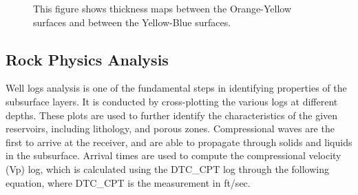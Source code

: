 \documentclass[fleqn]{article}
\begin{document}
\begin{figure}[H]
    \centering
    \caption{This figure shows thickness maps between the Orange-Yellow surfaces and between the Yellow-Blue surfaces.}
    \label{fig:ThicknessMaps}
\end{figure}

\subsection{Rock Physics Analysis}
Well logs analysis is one of the fundamental steps in identifying properties of the subsurface layers. It is conducted by cross-plotting the various logs at different depths. These plots are used to further identify the characteristics of the given reservoirs, including lithology, and porous zones. Compressional waves are the first to arrive at the receiver, and are able to propagate through solids and liquids in the subsurface. Arrival times are used to compute the compressional velocity (Vp) log, which is calculated using the DTC\_CPT log through the following equation, where DTC\_CPT is the measurement in ft/sec. 
\end{document}
